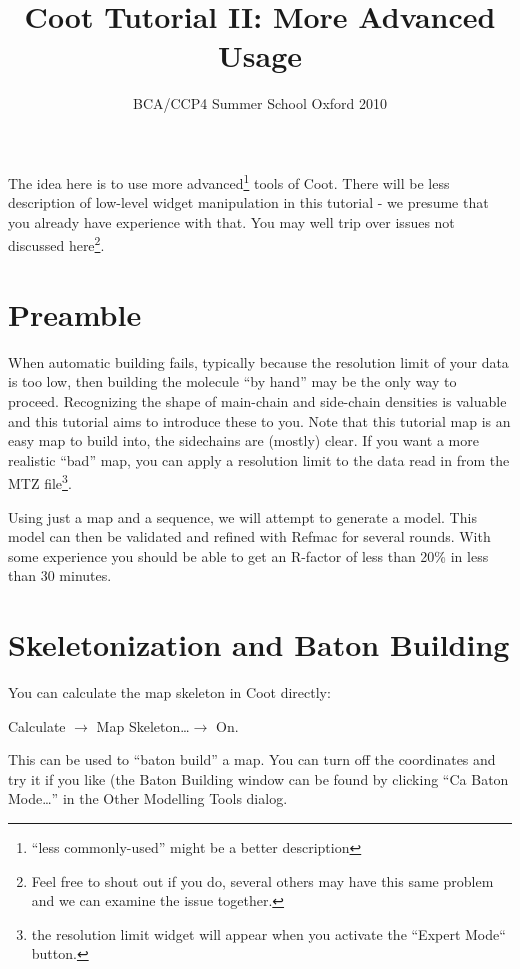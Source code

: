 \documentclass{article}
\title{Coot Tutorial II: More Advanced Usage}
\author{BCA/CCP4 Summer School Oxford 2010}
\begin{document}
\maketitle


   


The idea here is to use more advanced\footnote{``less commonly-used''
  might be a better description} tools of Coot.  There will be less
description of low-level widget manipulation in this tutorial - we
presume that you already have experience with that.  You may well trip
over issues not discussed here\footnote{Feel free to shout out if you
  do, several others may have this same problem and we can examine the
  issue together.}.

\section{Preamble}

When automatic building fails, typically because the resolution limit
of your data is too low, then building the molecule ``by hand'' may be
the only way to proceed.  Recognizing the shape of main-chain and
side-chain densities is valuable and this tutorial aims to introduce
these to you.  Note that this tutorial map is an easy map to build
into, the sidechains are (mostly) clear.  If you want a more realistic
``bad'' map, you can apply a resolution limit to the data read in from
the MTZ file\footnote{the resolution limit widget will appear when you
  activate the ``Expert Mode`` button.}.

Using just a map and a sequence, we will attempt to generate a model.
This model can then be validated and refined with Refmac for several
rounds.  With some experience you should be able to get an R-factor of
less than 20\% in less than 30 minutes.

\section{Skeletonization and Baton Building}


You can calculate the map skeleton in Coot directly:

\textsf{Calculate $\rightarrow$ Map Skeleton\ldots $\rightarrow$ On.}

This can be used to ``baton build'' a map.  You can turn off the
coordinates and try it if you like (the Baton Building window can be
found by clicking \textsf{``Ca Baton Mode\ldots''} in the Other
Modelling Tools dialog.
  
\end{document}
